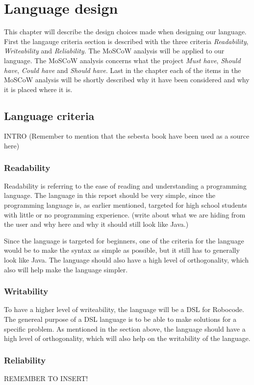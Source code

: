 \chapter{Language design}
This chapter will describe the design choices made when designing our language. First the langauge criteria section is described with the three criteria \textit{Readability}, \textit{Writeability} and \textit{Reliability}. The MoSCoW analysis will be applied to our language. The MoSCoW analysis concerns what the project \textit{Must have}, \textit{Should have}, \textit{Could have} and \textit{Should have}. Last in the chapter each of the  items in the MoSCoW analysis will be shortly described why it have been considered and why it is placed where it is.
\section{Language criteria}
INTRO
(Remember to mention that the sebesta book have been used as a source here)

\subsection{Readability}
Readability is referring to the ease of reading and understanding a programming language. The language in this report should be very simple, since the programming language is, as earlier mentioned, targeted for high school students with little or no programming experience. (write about what we are hiding from  the user and why here and why it should still look like Java.)

Since the language is targeted for beginners, one of the criteria for the language would be to make the syntax as simple as possible, but it still has to generally look like Java. The language should also have a high level of orthogonality, which also will help make the language simpler. 

\subsection{Writability}
To have a higher level of writeability, the language will be a DSL for Robocode. The genereal purpose of a DSL language is to be able to make solutions for a specific problem. As mentioned in the section above, the language should have a high level of orthogonality, which will also help on  the writability of the language.  

\subsection{Reliability}
REMEMBER TO INSERT!

